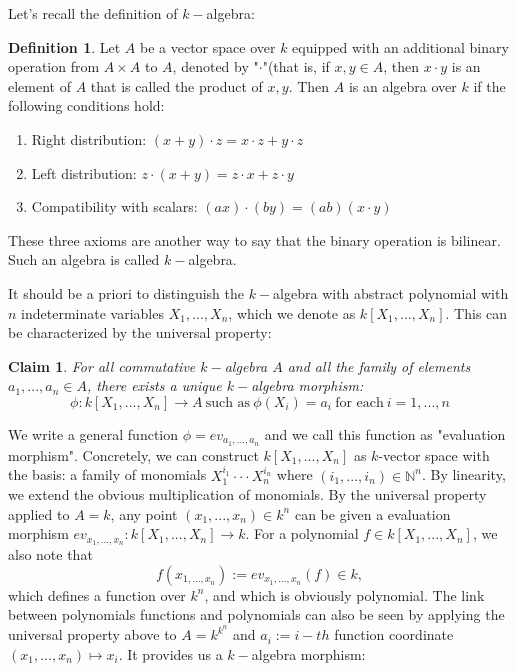 \documentclass[12pt,a4paper,english]{article}
\theoremstyle{plain}
\newtheorem{claim}{Claim}
\theoremstyle{definition}
\newtheorem{defi}{Definition}
\theoremstyle{remark}
\begin{document}
Let's recall the definition of $k-$algebra:
\begin{defi}
Let $A$ be a vector space over $k$ equipped with an additional binary operation from $A\times
A$ to $A$, denoted by "$\cdot$"(that is, if $x, y \in A$, then $x\cdot y $ is an element of $A$ that is called the product of $x,y$. Then $A$ is an algebra over $k$ if the following conditions hold:
\begin{enumerate}
    \item Right distribution: $(x+y)\cdot z = x\cdot z + y\cdot z$
    \item Left distribution: $z\cdot(x+y)=z\cdot x + z\cdot y$
    \item Compatibility with scalars: $(ax)\cdot (by)=(ab)(x\cdot y)$
\end{enumerate}
These three axioms are another way to say that the binary operation is bilinear. Such an algebra is called $k-$algebra.
\end{defi}
It should be a priori to distinguish the  $k-$algebra with abstract polynomial with $n$ indeterminate variables $X_{1},...,X_{n}$, which we denote as $k[X_{1},...,X_{n}]$. This can be characterized by the universal property: 
\begin{claim}
For all commutative $k-$algebra $A$ and all the family of elements $a_{1},...,a_{n}\in A$, there exists a unique $k-$algebra morphism:
\begin{equation*}
    \phi:k[X_{1},...,X_{n}]\rightarrow A\  \text{such as}\ \phi(X_{i})=a_{i}\ \text{for each}\ i = 1,...,n
\end{equation*}
\end{claim}
We write a general function $\phi = ev_{a_{1},...,a_{n}}$ and we call this function as "evaluation morphism". Concretely, we can construct $k[X_{1},...,X_{n}]$ as $k$-vector space with the basis: a family of monomials $X_{1}^{i_{1}}\cdot\cdot\cdot X_{n}^{i_{n}}$ where $(i_{1},...,i_{n})\in \mathbb{N}^{n}$. By linearity, we extend the obvious multiplication of monomials. By the universal property applied to $A=k$, any point $(x_{1},...,x_{n})\in k^{n}$ can be given a evaluation morphism $ev_{x_{1},...,x_{n}}:k[X_{1},...,X_{n}]\rightarrow k$. For a polynomial $f\in k[X_{1},...,X_{n}]$, we also note that
\begin{equation*}
    f(x_{1,...,x_{n}}):=ev_{x_{1},...,x_{n}}(f)\in k,
\end{equation*}
which defines a function over $k^{n}$, and which is obviously polynomial. The link between polynomials functions and polynomials can also be seen by applying the universal property above to $A=k^{k^{n}}$ and $a_{i}:=i-th$ function coordinate $(x_{1},...,x_{n})\mapsto x_{i}$. It provides us a $k-$algebra morphism:
\end{document}
